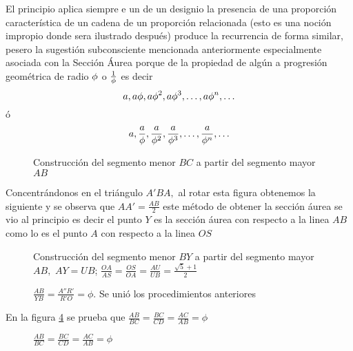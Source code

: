 El principio aplica siempre e un de un designio la presencia de una proporción característica  de un cadena  de un proporción relacionada (esto es una noción impropio  donde sera ilustrado después) produce la recurrencia de forma similar, pesero la sugestión subconsciente mencionada anteriormente especialmente asociada con la Sección Áurea porque de la propiedad de algún a progresión geométrica de radio $\phi$ o $\frac{1}{\phi}$ es decir $$a,a\phi,a\phi^2,a\phi^3,\ldots,a\phi^n,\ldots$$  ó $$a, \frac{a}{\phi},\frac{a}{\phi^2},\frac{a}{\phi^3},\ldots,\frac{a}{\phi^n},\ldots$$



\begin{figure}[!ht]
	\begin{center}
	\end{center}
	\caption{Construcción del segmento menor $BC$ a partir del segmento mayor $AB$}\label{KK}
\end{figure}

Concentrándonos en el triángulo  $A'BA,$   al rotar esta figura obtenemos la siguiente  y  se observa que $AA'=\frac{AB}{2}$ este método de obtener la sección áurea se vio al principio es decir el punto $Y$ es la sección áurea con respecto a la linea $AB$ como lo es el punto $A$ con respecto a la linea $OS$

\begin{figure}[!ht]
	\begin{center}

	\end{center}
	\caption{Construcción del segmento menor $BY$ a partir del segmento mayor $AB,$ $AY=UB$; $\frac{OA}{AS}=\frac{OS}{OA}=\frac{AU}{UB}=\frac{\sqrt{5}+1}{2}$}\label{H}
\end{figure}


\emph{}


\begin{figure}[!ht]
	\begin{center}
	\end{center}
	\caption{$\frac{AB}{YB}=\frac{A''R'}{R'O}=\phi.$ Se unió los procedimientos anteriores}\label{j}
\end{figure}

En la figura \ref{sed} se prueba que $\frac{AB}{BC}=\frac{BC}{CD}=\frac{AC}{AB}=\phi$


\begin{figure}[!ht]
	\begin{center}

	\end{center}
	\caption{$\frac{AB}{BC}=\frac{BC}{CD}=\frac{AC}{AB}=\phi$}\label{sed}
\end{figure}




